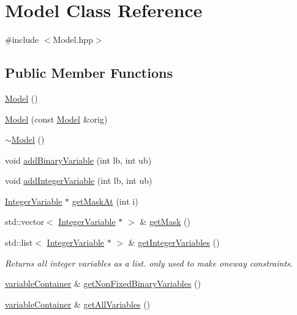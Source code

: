 \hypertarget{class_model}{\section{Model Class Reference}
\label{class_model}
}


{\ttfamily \#include $<$Model.\-hpp$>$}

\subsection*{Public Member Functions}
\begin{DoxyCompactItemize}
\item 
\hyperlink{class_model_ae3b375de5f6df4faf74a95d64748e048}{Model} ()
\item 
\hyperlink{class_model_afdedf278781f785abeecf5f450e43653}{Model} (const \hyperlink{class_model}{Model} \&orig)
\item 
\hyperlink{class_model_ad6ebd2062a0b823db841a0b88baac4c0}{$\sim$\-Model} ()
\item 
void \hyperlink{class_model_ab4a45c7798de6427e24d4d0116db2e70}{add\-Binary\-Variable} (int lb, int ub)
\item 
void \hyperlink{class_model_a7b8e21078dbcbb489f985bf13b03f76e}{add\-Integer\-Variable} (int lb, int ub)
\item 
\hyperlink{class_integer_variable}{Integer\-Variable} $\ast$ \hyperlink{class_model_a7ab387183363c4784c44b5bcf8132198}{get\-Mask\-At} (int i)
\item 
std\-::vector$<$ \hyperlink{class_integer_variable}{Integer\-Variable} $\ast$ $>$ \& \hyperlink{class_model_a62dcb95de0df2587cb82f1dcc469b443}{get\-Mask} ()
\item 
std\-::list$<$ \hyperlink{class_integer_variable}{Integer\-Variable} $\ast$ $>$ \& \hyperlink{class_model_aa4dbcf1abedc835ac9017c320fbd91be}{get\-Integer\-Variables} ()
\begin{DoxyCompactList}\small\item\em Returns all integer variables as a list. only used to make oneway constraints. \end{DoxyCompactList}\item 
\hyperlink{_constants_8hpp_a30d6ea0a65b32e8b74cc6126cea9852e}{variable\-Container} \& \hyperlink{class_model_a8416f0b4c7db6b2a5ff5edf4aa0bf3db}{get\-Non\-Fixed\-Binary\-Variables} ()
\item 
\hyperlink{_constants_8hpp_a30d6ea0a65b32e8b74cc6126cea9852e}{variable\-Container} \& \hyperlink{class_model_acdcb4f81370ca74c301faceae32cb466}{get\-All\-Variables} ()

\end{DoxyCompactItemize}

